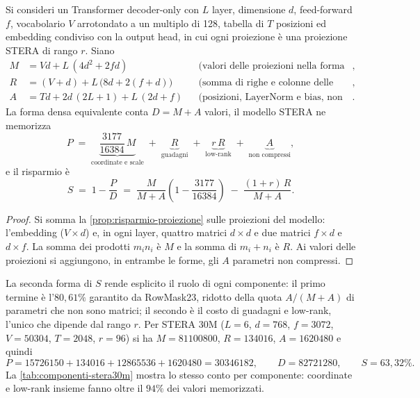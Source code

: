 \begin{proposizione}
\label{prop:risparmio-modello}
Si consideri un Transformer decoder-only con $L$ layer, dimensione $d$, feed-forward $f$, vocabolario $V$ arrotondato a un multiplo di 128, tabella di $T$ posizioni ed embedding condiviso con la output head, in cui ogni proiezione è una proiezione STERA di rango $r$. Siano
\[
\begin{aligned}
M &= V d + L\,(4d^2 + 2fd) &&\text{(valori delle proiezioni nella forma densa)},\\
R &= (V+d) + L\,\big(8d + 2(f+d)\big) &&\text{(somma di righe e colonne delle proiezioni)},\\
A &= T d + 2d\,(2L+1) + L\,(2d+f) &&\text{(posizioni, LayerNorm e bias, non compressi)}.
\end{aligned}
\]
La forma densa equivalente conta $D = M + A$ valori, il modello STERA ne memorizza
\[
P \;=\; \underbrace{\frac{3177}{16384}\,M}_{\text{coordinate e scale}} \;+\; \underbrace{R}_{\text{guadagni}} \;+\; \underbrace{r\,R}_{\text{low-rank}} \;+\; \underbrace{A}_{\text{non compressi}},
\]
e il risparmio è
\[
S \;=\; 1 - \frac{P}{D} \;=\; \frac{M}{M+A}\left(1-\frac{3177}{16384}\right) \;-\; \frac{(1+r)\,R}{M+A}.
\]
\end{proposizione}

\begin{proof}
Si somma la \autoref{prop:risparmio-proiezione} sulle proiezioni del modello: l'embedding ($V\times d$) e, in ogni layer, quattro matrici $d\times d$ e due matrici $f\times d$ e $d\times f$. La somma dei prodotti $m_i n_i$ è $M$ e la somma di $m_i+n_i$ è $R$. Ai valori delle proiezioni si aggiungono, in entrambe le forme, gli $A$ parametri non compressi.
\end{proof}

La seconda forma di $S$ rende esplicito il ruolo di ogni componente: il primo termine è l'$80{,}61\%$ garantito da RowMask23, ridotto della quota $A/(M+A)$ di parametri che non sono matrici; il secondo è il costo di guadagni e low-rank, l'unico che dipende dal rango $r$. Per STERA 30M ($L=6$, $d=768$, $f=3072$, $V=\num{50304}$, $T=\num{2048}$, $r=96$) si ha $M=\num{81100800}$, $R=\num{134016}$, $A=\num{1620480}$ e quindi
\[
P = \num{15726150} + \num{134016} + \num{12865536} + \num{1620480} = \num{30346182},
\qquad D = \num{82721280},
\qquad S = 63{,}32\%.
\]
La \autoref{tab:componenti-stera30m} mostra lo stesso conto per componente: coordinate e low-rank insieme fanno oltre il $94\%$ dei valori memorizzati.

